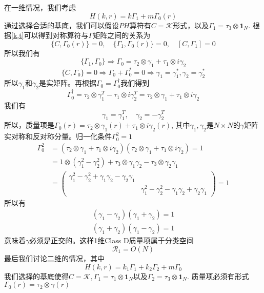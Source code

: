 \documentclass[a4paper]{article}
\numberwithin{equation}{subsection}
\begin{document}
在一维情况，我们考虑
\begin{equation}
    H(k,r)=k\Gamma_1+m\Gamma_0(r)
\end{equation}
通过选择合适的基底，我们可以假设$PH$算符有$C=\mathcal{K}$形式，以及$\Gamma_1=\tau_3\otimes \mathbf{1}_N$. 根据\eqref{k,t}可以得到对称算符与$\Gamma$矩阵之间的关系为
\begin{equation}
    \{C,\Gamma_0(r)\}=0,\quad \{\Gamma_1,\Gamma_0(r)\}=0,\quad [C,\Gamma_1]=0
\end{equation}
所以我们有
\begin{equation}
    \{\Gamma_1,\Gamma_0\}\Rightarrow \Gamma_0=\tau_2\otimes\gamma_1+\tau_1\otimes i\gamma_2
\end{equation}
\begin{equation}
    \{C,\Gamma_0\}=0\Rightarrow \Gamma_0+\Gamma_0^*=0\Rightarrow \gamma_1=\gamma_1^*,\gamma_2=\gamma_2^*
\end{equation}
所以$\gamma_1$和$\gamma_2$是实矩阵。再根据$\Gamma_0=\Gamma_0^\dagger$我们得到
\begin{equation}
    \Gamma_0^\dagger=\tau_2\otimes\gamma_1^T-\tau_1\otimes i\gamma_2^T=\tau_2\otimes\gamma_1+\tau_1\otimes i\gamma_2
\end{equation}
我们有
\begin{equation}
    \gamma_1=\gamma_1^T,\quad \gamma_2=-\gamma_2^T
\end{equation}
所以，质量项是$\Gamma_0(r)=\tau_2\otimes \gamma_1(r)+\tau_1\otimes i\gamma_2(r)$, 其中$\gamma_1,\gamma_2$是$N\times N$的$\gamma$矩阵实对称和反对称分量。归一化条件$\Gamma_0^2=1$
\begin{equation}
    \begin{split}
        \Gamma_0^2&=(\tau_2\otimes\gamma_1+\tau_1\otimes i\gamma_2)(\tau_2\otimes\gamma_1+\tau_1\otimes i\gamma_2)=1\\
    &=1\otimes(\gamma_1^2-\gamma_2^2)+\tau_3\otimes \gamma_1\gamma_2-\tau_3\otimes\gamma_2\gamma_1\\
    &=\begin{pmatrix}
        \gamma_1^2-\gamma_2^2+\gamma_1\gamma_2-\gamma_2\gamma_1&\\
        &\gamma_1^2-\gamma_2^2-\gamma_1\gamma_2+\gamma_2\gamma_1
    \end{pmatrix}=1
    \end{split}
\end{equation}
所以有
\begin{equation}
    \begin{split}
        (\gamma_1-\gamma_2)(\gamma_1+\gamma_2)=1\\
        (\gamma_1+\gamma_2)(\gamma_1-\gamma_2)=1
    \end{split}
\end{equation}
意味着$\gamma$必须是正交的。这样1维Class D质量项属于分类空间
\begin{equation}
    \mathcal{R}_1=O(N)
\end{equation}
最后我们讨论二维的情况，其中
\begin{equation}
    H(k,r)=k_1\Gamma_1+k_2\Gamma_2+m\Gamma_0
\end{equation}
我们选择的基底使得$C=\mathcal{K},\Gamma_1=\tau_1\otimes \mathbf{1}_N$以及$\Gamma_2=\tau_3\otimes \mathbf{1}_N$. 质量项必须有形式$\Gamma_0(r)=\tau_2\otimes \gamma(r)$
\end{document}
